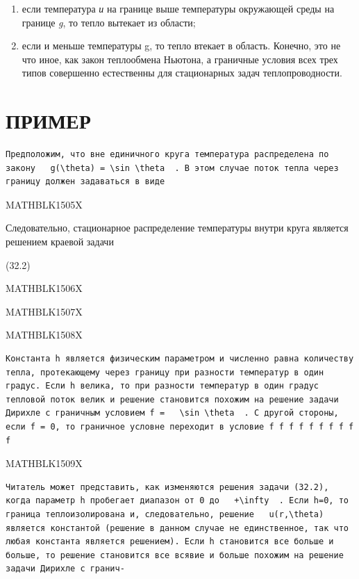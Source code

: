 \documentclass[
]{article}
\begin{document}
{{{\begin{enumerate}
\def\labelenumi{\arabic{enumi})}
\item
  если температура \emph{и} на границе выше температуры окружающей среды
  на границе \emph{g}, то тепло вытекает из области;
\item
  если и меньше температуры g, то тепло втекает в область. Конечно, это
  не что иное, как закон теплообмена Ньютона, а граничные условия всех
  трех типов совершенно естественны для стационарных задач
  теплопроводности.
\end{enumerate}

\section{ПРИМЕР}\label{ux43fux440ux438ux43cux435ux440-1}

\begin{verbatim}
Предположим, что вне единичного круга температура распределена по закону   g(\theta) = \sin \theta  . В этом случае поток тепла через границу должен задаваться в виде
\end{verbatim}

MATHBLK1505X

Следовательно, стационарное распределение температуры внутри круга
является решением краевой задачи

(32.2)

MATHBLK1506X

MATHBLK1507X

MATHBLK1508X

\begin{verbatim}
Константа h является физическим параметром и численно равна количеству тепла, протекающему через границу при разности температур в один градус. Если h велика, то при разности температур в один градус тепловой поток велик и решение становится похожим на решение задачи Дирихле с граничным условием f =   \sin \theta  . С другой стороны, если f = 0, то граничное условне переходит в условие f f f f f f f f f f
\end{verbatim}

MATHBLK1509X

\begin{verbatim}
Читатель может представить, как изменяются решения задачи (32.2), когда параметр h пробегает диапазон от 0 до   +\infty  . Если h=0, то граница теплоизолирована и, следовательно, решение   u(r,\theta)   является константой (решение в данном случае не единственное, так что любая константа является решением). Если h становится все больше и больше, то решение становится все всявие и больше похожим на решение задачи Дирихле с гранич-


\end{verbatim}}}}
\end{document}
